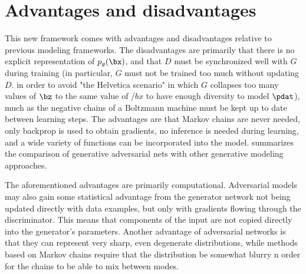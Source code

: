 \section{Advantages and disadvantages}

This new framework comes with advantages and disadvantages relative to previous modeling frameworks. The disadvantages are primarily that there is no explicit representation of $p_g(\bx)$, and that $D$ must be synchronized well with $G$ during training (in particular, $G$ must not be trained too much without updating $D$. in order to avoid "the Helvetica scenario"%
in which $G$ collapses too many values of $\bz$ to the same value of $/bx$ to have enough diversity to model $\pdat$), much as the negative chains of a Boltzmann machine must be kept up to date between learning steps. The advantages are that Markov chains are never needed, only backprop is used to obtain gradients, no inference is needed during learning, and a wide variety of functions can be incorporated into the model. %
summarizes the comparison of generative adversarial nets with other generative modeling approaches.

The aforementioned advantages are primarily computational. Adversarial models may also gain some statistical advantage from the generator network not being updated directly with data examples, but only with gradients flowing through the discriminator. This means that components of the input are not copied directly into the generator’s parameters. Another advantage of adversarial networks is that they can represent very sharp, even degenerate distributions, while methods based on Markov chains require that the distribution be somewhat blurry n order for the chains to be able to mix between modes.
